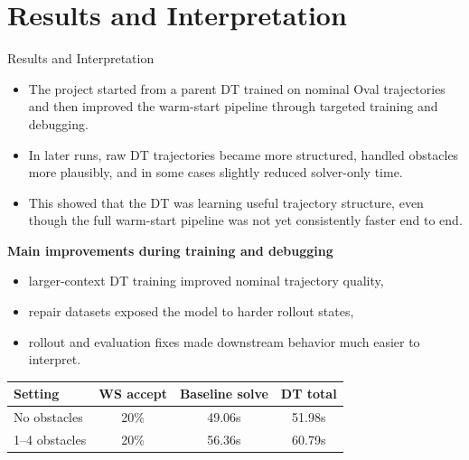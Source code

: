 \documentclass[aspectratio=169]{beamer}
\begin{document}
\section{Results and Interpretation}
\begin{frame}{Results and Interpretation}
\begin{itemize}
  \item The project started from a parent DT trained on nominal Oval trajectories and then improved the warm-start pipeline through targeted training and debugging.
  \item In later runs, raw DT trajectories became more structured, handled obstacles more plausibly, and in some cases slightly reduced solver-only time.
  \item This showed that the DT was learning useful trajectory structure, even though the full warm-start pipeline was not yet consistently faster end to end.
\end{itemize}

\vspace{0.4em}
\textbf{Main improvements during training and debugging}
\begin{itemize}
  \item larger-context DT training improved nominal trajectory quality,
  \item repair datasets exposed the model to harder rollout states,
  \item rollout and evaluation fixes made downstream behavior much easier to interpret.
\end{itemize}

\vspace{0.4em}
\begin{center}
\footnotesize
\begin{tabular}{lccc}
\toprule
\textbf{Setting} & \textbf{WS accept} & \textbf{Baseline solve} & \textbf{DT total} \\
\midrule
No obstacles & 20\% & 49.06s & 51.98s \\
1--4 obstacles & 20\% & 56.36s & 60.79s \\
\bottomrule
\end{tabular}
\end{center}
\end{frame}
\end{document}
